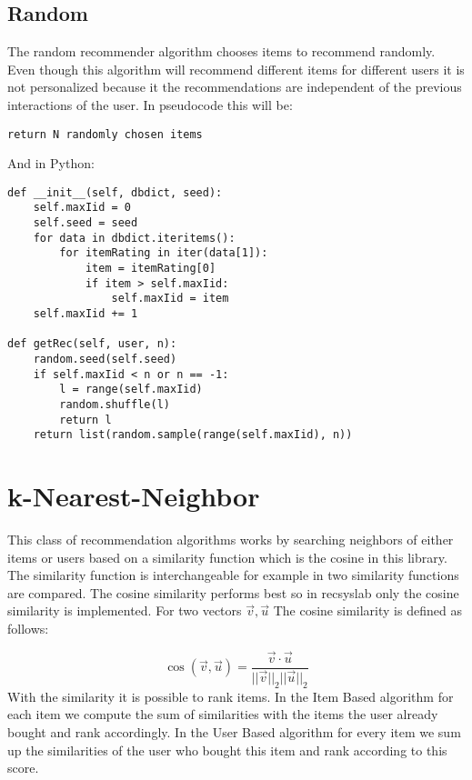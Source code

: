\subsection{Random}

The random recommender algorithm chooses items to recommend randomly.
Even though this algorithm will recommend different items for different
users it is not personalized because it the recommendations are
independent of the previous interactions of the user.
In pseudocode this will be:
\begin{lstlisting}[style=pseudocode]
return N randomly chosen items
\end{lstlisting}
And in Python:
\begin{lstlisting}[style=python]
def __init__(self, dbdict, seed):
    self.maxIid = 0
    self.seed = seed
    for data in dbdict.iteritems():
        for itemRating in iter(data[1]):
            item = itemRating[0]
            if item > self.maxIid:
                self.maxIid = item
    self.maxIid += 1

def getRec(self, user, n):
    random.seed(self.seed)
    if self.maxIid < n or n == -1:
        l = range(self.maxIid)
        random.shuffle(l)
        return l
    return list(random.sample(range(self.maxIid), n))
\end{lstlisting}


\section{k-Nearest-Neighbor}

This class of recommendation algorithms works by searching neighbors
of either items or users based on a similarity function which is the
cosine in this library. The similarity function is interchangeable 
for example in
\cite{Karypis:2001:EIT:502585.502627} two similarity functions are
compared. The cosine similarity performs best so in recsyslab only the cosine similarity
is implemented. For two vectors \(\vec{v},\vec{u}\)
The cosine similarity is defined as follows:

\begin{equation}
\cos(\vec{v}, \vec{u})=\frac{\vec{v} \cdot \vec{u}}{||\vec{v}||_{2} ||\vec{u}||_{2}}
\end{equation}
With the similarity it is possible to rank items.
In the Item Based algorithm for each item we compute the sum of 
similarities with the items the user already bought and rank 
accordingly.
In the User Based algorithm for every item we sum up the 
similarities of the user who bought this item and rank
according to this score.



